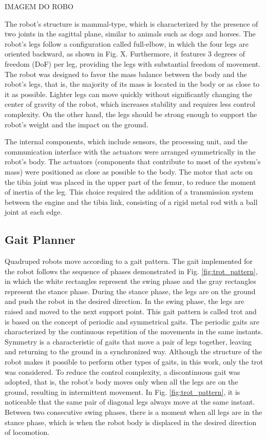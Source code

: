 \documentclass[conference]{IEEEtran}
\begin{document}
IMAGEM DO ROBO

The robot's structure is mammal-type, which is characterized by the presence of two joints in the sagittal plane, similar to animals such as dogs and horses.  The robot's legs follow a configuration called full-elbow, in which the four legs are oriented backward, as shown in Fig. X. Furthermore, it features 3 degrees of freedom (DoF) per leg, providing the legs with substantial freedom of movement. The robot was designed to favor the mass balance between the body and the robot's legs, that is, the majority of its mass is located in the body or as close to it as possible. Lighter legs can move quickly without significantly changing the center of gravity of the robot, which increases stability and requires less control complexity.  On the other hand, the legs should be strong enough to support the robot's weight and the impact on the ground. 

The internal components, which include sensors, the processing unit, and the communication interface with the actuators were arranged symmetrically in the robot's body. The actuators (components that contribute to most of the system's mass) were positioned as close as possible to the body. The motor that acts on the tibia joint was placed in the upper part of the femur, to reduce the moment of inertia of the leg. This choice required the addition of a transmission system between the engine and the tibia link, consisting of a rigid metal rod with a ball joint at each edge.

\subsection{Gait Planner}

Quadruped robots move according to a gait pattern. The gait implemented for the robot follows the sequence of phases demonstrated in Fig. \ref{fig:trot_pattern}, in which the white rectangles represent the swing phase and the gray rectangles represent the stance phase. During the stance phase, the legs are on the ground and push the robot in the desired direction.  In the swing phase, the legs are raised and moved to the next support point. This gait pattern is called trot and is based on the concept of periodic and symmetrical gaits. The periodic gaits are characterized by the continuous repetition of the movements in the same instants. Symmetry is a characteristic of gaits that move a pair of legs together, leaving and returning to the ground in a synchronized way. Although the structure of the robot makes it possible to perform other types of gaits, in this work, only the trot was considered. To reduce the control complexity, a discontinuous gait was adopted, that is, the robot's body moves only when all the legs are on the ground, resulting in intermittent movement. In Fig. \ref{fig:trot_pattern}, it is noticeable that the same pair of diagonal legs always move at the same instant. Between two consecutive swing phases, there is a moment when all legs are in the stance phase, which is when the robot body is displaced in the desired direction of locomotion.
\end{document}
